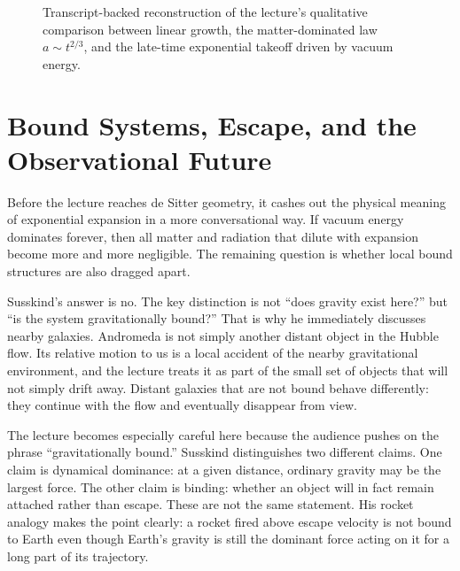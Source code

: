 \begin{figure}[htbp]
\centering
{}
\caption{Transcript-backed reconstruction of the lecture's qualitative comparison between linear growth, the matter-dominated law \(a\sim t^{2/3}\), and the late-time exponential takeoff driven by vacuum energy.}
\end{figure}

\section{Bound Systems, Escape, and the Observational Future}

Before the lecture reaches de Sitter geometry, it cashes out the physical meaning of exponential expansion in a more conversational way. If vacuum energy dominates forever, then all matter and radiation that dilute with expansion become more and more negligible. The remaining question is whether local bound structures are also dragged apart.

Susskind's answer is no. The key distinction is not ``does gravity exist here?'' but ``is the system gravitationally bound?'' That is why he immediately discusses nearby galaxies. Andromeda is not simply another distant object in the Hubble flow. Its relative motion to us is a local accident of the nearby gravitational environment, and the lecture treats it as part of the small set of objects that will not simply drift away. Distant galaxies that are not bound behave differently: they continue with the flow and eventually disappear from view.

The lecture becomes especially careful here because the audience pushes on the phrase ``gravitationally bound.'' Susskind distinguishes two different claims. One claim is dynamical dominance: at a given distance, ordinary gravity may be the largest force. The other claim is binding: whether an object will in fact remain attached rather than escape. These are not the same statement. His rocket analogy makes the point clearly: a rocket fired above escape velocity is not bound to Earth even though Earth's gravity is still the dominant force acting on it for a long part of its trajectory.

